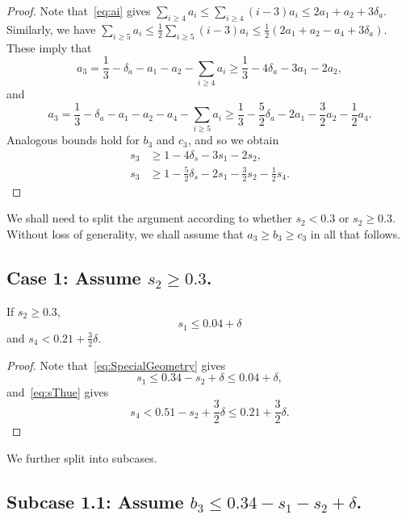 \begin{proof}
  \leanok
  Note that~\eqref{eq:ai} gives $\sum_{i\ge4}a_i \le \sum_{i\ge4}(i-3)a_i \le 2a_1+a_2+3\delta_a$. Similarly, we have $\sum_{i\ge5}a_i \le \frac{1}{2}\sum_{i\ge5}(i-3)a_i\le\frac{1}{2}(2a_1+a_2-a_4+3\delta_a)$. These imply that
  \begin{equation*}
  a_3 = \frac{1}{3}-\delta_a - a_1-a_2 - \sum_{i\ge4}a_i \ge \frac{1}{3}-4\delta_a - 3a_1 - 2a_2,
  \end{equation*}
  and
  \[
  a_3 = \frac{1}{3}-\delta_a - a_1-a_2 - a_4 - \sum_{i\ge5}a_i \ge \frac{1}{3}-\frac{5}{2}\delta_a - 2a_1 - \frac{3}{2}a_2 - \frac{1}{2}a_4.
  \]
  Analogous bounds hold for $b_3$ and $c_3$, and so we obtain
  \begin{align*}
  s_3 &\ge 1-4\delta_s - 3s_1 - 2s_2, \\
  s_3 & \ge 1-\frac{5}{2}\delta_s - 2s_1 - \frac{3}{2}s_2 - \frac{1}{2}s_4.
  \end{align*}
\end{proof}


We shall need to split the argument according to whether $s_2<0.3$ or
$s_2\geq 0.3$.
Without loss of generality, we shall assume that $a_3\ge b_3\ge c_3$ in all that follows.


\subsection*{Case 1: Assume $s_2\ge 0.3$.}

\begin{lemma}\label{lem:Case1Basic}
  \leanok
  If $s_2 \geq 0.3$,
  \begin{equation}\label{eq:s1}
    s_1 \leq 0.04+\delta
  \end{equation}
  and $s_4 < 0.21 +\frac{3}{2}\delta.$
\end{lemma}
\begin{proof}
  \leanok
  Note that~\eqref{eq:SpecialGeometry} gives
  \begin{equation}
    s_1 \leq 0.34-s_2+\delta \le 0.04+\delta,
  \end{equation}
  and~\eqref{eq:sThue} gives \[
  s_4 < 0.51-s_2 +\frac{3}{2}\delta\le 0.21 +\frac{3}{2}\delta.
  \]
\end{proof}

We further split into subcases.
\subsection*{Subcase 1.1: Assume $b_3\le 0.34-s_1-s_2+\delta$.}

